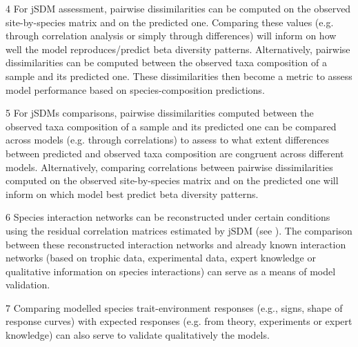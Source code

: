 \begin{landscape}
\begin{table}[htbp]
\begin{threeparttable}
\begin{tablenotes}
        \item[4] For jSDM assessment, pairwise dissimilarities can be computed on the observed site-by-species matrix and on the predicted one. Comparing these values (e.g. through correlation analysis or simply through differences) will inform on how well the model reproduces/predict beta diversity patterns. Alternatively, pairwise dissimilarities can be computed between the observed taxa composition of a sample and its predicted one. These dissimilarities then become a metric to assess model performance based on species-composition predictions.
        \item[5] For jSDMs comparisons, pairwise dissimilarities computed between the observed taxa composition of a sample and its predicted one can be compared across models (e.g. through correlations) to assess to what extent differences between predicted and observed taxa composition are congruent across different models. Alternatively, comparing correlations between pairwise dissimilarities computed on the observed site-by-species matrix and on the predicted one will inform on which model best predict beta diversity patterns.
        \item[6] Species interaction networks can be reconstructed under certain conditions using the residual correlation matrices estimated by jSDM (see \textcite{Momal_2020}). The comparison between these reconstructed interaction networks and already known interaction networks (based on trophic data, experimental data, expert knowledge or qualitative information on species interactions) can serve as a means of model validation.
        \item[7] Comparing modelled species trait-environment responses (e.g., signs, shape of response curves) with expected responses (e.g. from theory, experiments or expert knowledge) can also serve to validate qualitatively the models.
    \end{tablenotes}
    \end{threeparttable}
\end{table}
\end{landscape}
\label{tbl1}
\restoregeometry

